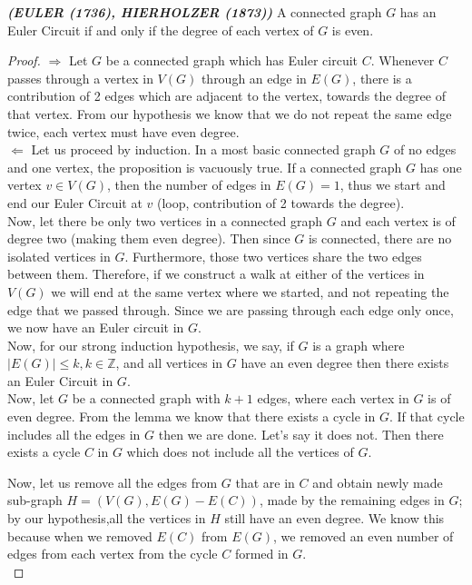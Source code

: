 \documentclass[17pt]{article}
\newcommand{\Z}{\mathbb Z}
\begin{document}
	\textit{\textbf{(EULER (1736), HIERHOLZER (1873))}} A connected graph $G$ has an Euler Circuit if and only if the degree of each vertex of $G$ is even.
\begin{proof}
 	$\Longrightarrow$ Let $G$ be a connected graph which has Euler circuit $C$. Whenever $C$ passes through a vertex in $V(G)$ through an edge in $E(G)$, there is a contribution of 2 edges which are adjacent to the vertex, towards the degree of that vertex. From our hypothesis we know that we do not repeat the same edge twice, each vertex must have even degree. \\
 	
 	$\Longleftarrow$ Let us proceed by induction. In a most basic connected graph $G$ of no edges and one vertex, the proposition is vacuously true. If a connected graph $G$ has one vertex $v \in V(G)$, then the number of edges in $E(G) = 1$, thus we start and end our Euler Circuit at $v$ (loop, contribution of 2 towards the degree). \\
 	
 	Now, let there be only two vertices in a connected graph $G$ and each vertex is of degree two (making them even degree). Then since $G$ is connected, there are no isolated vertices in $G$. Furthermore, those two vertices share the two edges between them. Therefore, if we construct a walk at either of the vertices in $V(G)$ we will end at the same vertex where we started, and not repeating the edge that we passed through. Since we are passing through each edge only once, we now have an Euler circuit in $G$.\\ 
 	
 	Now, for our strong induction hypothesis, we say, if $G$ is a graph where $\vert E(G)\vert \leq k, k \in \Z$, and all vertices in $G$ have an even degree then there exists an Euler Circuit in $G$.\\
 	
 	 Now, let $G$ be a connected graph with $k+1$ edges, where each vertex in $G$ is of even degree. From the lemma we know that there exists a cycle in $G$. If that cycle includes all the edges in $G$ then we are done. Let's say it does not. Then there exists a cycle $C$ in $G$ which does not include all the vertices of $G$. 
 	 
 	 Now, let us remove all the edges from $G$ that are in $C$ and obtain newly made sub-graph $H = (V(G), E(G)-E(C))$, made by the remaining edges in $G$; by our hypothesis,all the vertices in $H$ still have an even degree. We know this because when we removed $E(C)$ from $E(G)$, we removed an even number of edges from each vertex from the cycle $C$ formed in $G$.\\
 	 

\end{proof}
\end{document}
